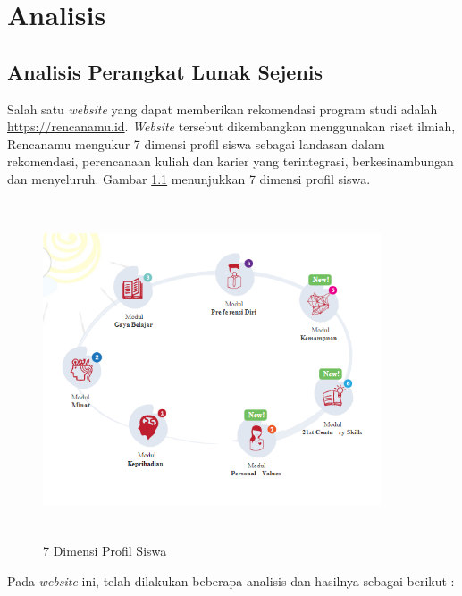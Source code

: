 \chapter{Analisis}
\label{chap:analisis}

\section{Analisis Perangkat Lunak Sejenis}
\label{sec:analisis pl}

Salah satu \textit{website} yang dapat memberikan rekomendasi program studi adalah \url{https://rencanamu.id}. \textit{Website} tersebut dikembangkan menggunakan riset ilmiah, Rencanamu mengukur 7 dimensi profil siswa sebagai landasan dalam rekomendasi, perencanaan kuliah dan karier yang terintegrasi, berkesinambungan dan menyeluruh. Gambar \ref{gambar31} menunjukkan 7 dimensi profil siswa. %

\begin{figure}[H]
    \centering
    \includegraphics[width = 10cm, height = 10cm]{doc/DokumenSkripsi/Gambar/gambar31.PNG}
    \caption{7 Dimensi Profil Siswa}
    \label{gambar31}
\end{figure}

Pada \textit{website} ini, telah dilakukan beberapa analisis dan hasilnya sebagai berikut :

